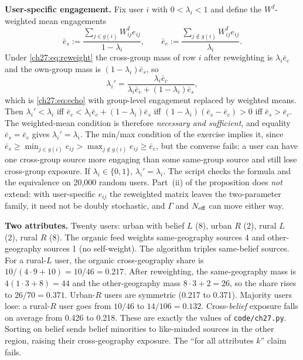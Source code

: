 \documentclass[../solutions_manual.tex]{subfiles}
\begin{document}
 \textbf{User-specific engagement.} Fix user $i$ with $0 < \lambda_i < 1$ and define the $W^I$-weighted mean engagements
\[
\bar e_s := \frac{\sum_{j\in g(i)}W^I_{ij}e_{ij}}{1-\lambda_i}, \qquad \bar e_c := \frac{\sum_{j\notin g(i)}W^I_{ij}e_{ij}}{\lambda_i}.
\]
Under \eqref{ch27:eq:reweight} the cross-group mass of row $i$ after reweighting is $\lambda_i\bar e_c$ and the own-group mass is $(1-\lambda_i)\bar e_s$, so
\[
\lambda_i' = \frac{\lambda_i\bar e_c}{\lambda_i\bar e_c + (1-\lambda_i)\bar e_s},
\]
which is \eqref{ch27:eq:echo} with group-level engagement replaced by weighted means. Then $\lambda_i' < \lambda_i$ iff $\bar e_c < \lambda_i\bar e_c + (1-\lambda_i)\bar e_s$ iff $(1-\lambda_i)(\bar e_s - \bar e_c) > 0$ iff $\bar e_s > \bar e_c$. The weighted-mean condition is therefore \emph{necessary and sufficient}, and equality $\bar e_s = \bar e_c$ gives $\lambda_i' = \lambda_i$. The min/max condition of the exercise implies it, since $\bar e_s \ge \min_{j\in g(i)}e_{ij} > \max_{j\notin g(i)}e_{ij} \ge \bar e_c$, but the converse fails: a user can have one cross-group source more engaging than some same-group source and still lose cross-group exposure. If $\lambda_i \in \{0, 1\}$, $\lambda_i' = \lambda_i$. The script checks the formula and the equivalence on 20{,}000 random users. Part~(ii) of the proposition does \emph{not} extend: with user-specific $e_{ij}$ the reweighted matrix leaves the two-parameter family, it need not be doubly stochastic, and $\Gamma$ and $N_{\text{eff}}$ can move either way.

 \textbf{Two attributes.} Twenty users: urban with belief $L$ (8), urban $R$ (2), rural $L$ (2), rural $R$ (8). The organic feed weights same-geography sources 4 and other-geography sources 1 (no self-weight). The algorithm triples same-belief sources. For a rural-$L$ user, the organic cross-geography share is $10/(4\cdot 9 + 10) = 10/46 = 0.217$. After reweighting, the same-geography mass is $4(1\cdot 3 + 8) = 44$ and the other-geography mass $8\cdot3 + 2 = 26$, so the share rises to $26/70 = 0.371$. Urban-$R$ users are symmetric (0.217 to 0.371). Majority users lose: a rural-$R$ user goes from $10/46$ to $14/106 = 0.132$. Cross-\emph{belief} exposure falls on average from 0.426 to 0.218. These are exactly the values of \texttt{code/ch27.py}. Sorting on belief sends belief minorities to like-minded sources in the other region, raising their cross-geography exposure. The ``for all attributes $k$'' claim fails.
\end{document}
